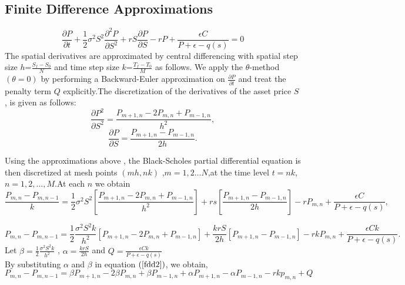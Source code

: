 \documentclass[12pt]{article}
\numberwithin{equation}{subsection} %
\begin{document}
\subsection{Finite Difference  Approximations}
\begin{equation}\label{fd1}
\frac{\partial P}{\partial t}+\frac{1}{2}\sigma^2
S^2\frac{\partial^2 P}{\partial S ^2}+rS\frac{\partial P}{\partial
S}-rP +\frac{{\epsilon}C}{P+\epsilon-q(s)}=0
\end{equation}
The spatial derivatives are approximated by central differencing
with spatial step size $h$=$\frac{S_{f}-S_{0}}{N}$ and time step
size $k$=$\frac{T_{f}-T_{0}}{M}$ as
 follows. We apply the $\theta$-method$(\theta=0)$ \cite{BOA08} by  performing  a
Backward-Euler approximation on
 $\frac{\partial P}{\partial t}$ and treat the penalty  term $ Q$
 explicitly.The discretization of  the derivatives of the asset
 price $S$, is given as follows:
 \begin{equation*}
\frac{\partial P^2}{\partial
S^2}=\frac{P_{m+1,n}-2P_{m,n}+P_{m-1,n}}{h^2},
 \end{equation*}
 \vspace{5mm}
  \begin{equation*}
\frac{\partial P}{\partial S}=\frac{P_{m+1,n}-P_{m-1,n}}{2h}.
 \end{equation*}




 Using the approximations above , the Black-Scholes partial differential
 equation is then discretized at  mesh points $(mh,nk)$ ,$m=1,2...N$,at
 the time level $t=nk$,$n=1,2,...,M$.At each $n$ we obtain
 \begin{equation}\label{fdd1}
  \frac{P_{m,n}-P_{m,n-1}}{k}=\frac{1}{2}\sigma^2S^2\left[\frac{P_{m+1,n}-2P_{m,n}+P_{m-1,n}}{h^2}\right]+rs\left[\frac{P_{m+1,n}-P_{m-1,n}}{2h}\right]-rP_{m,n}+\frac{{\epsilon}C}{P+\epsilon-q(s)},
 \end{equation}

  \begin{equation}\label{fdd2}
P_{m,n}-P_{m,n-1}=\frac{1}{2}\frac{\sigma^2S^2k}{h^2}\left[
P_{m+1,n}-2P_{m,n}+P_{m-1,n}\right]+\frac{krS}{2h}\left[
P_{m+1,n}-P_{m-1,n}\right]-rkP_{m,n}+\frac{{\epsilon}Ck}{P+\epsilon-q(s)}.
 \end{equation}
 Let $\beta=\frac{1}{2}\frac{\sigma^2S^2k}{h^2}$ , $\alpha=\frac{krS}{2h}$
 and $Q=\frac{{\epsilon}Ck}{P+\epsilon-q(s)}$\\
By substituting $\alpha$ and $\beta$ in equation $(\ref{fdd2})$, we
obtain,
 \begin{equation*}
P_{m,n}-P_{m,n-1}=\beta P_{m+1,n}-2\beta P_{m,n}+\beta
P_{m-1,n}+\alpha P_{m+1,n}-\alpha P_{m-1,n}-rkp_{m,n} +Q
 \end{equation*}
\end{document}
